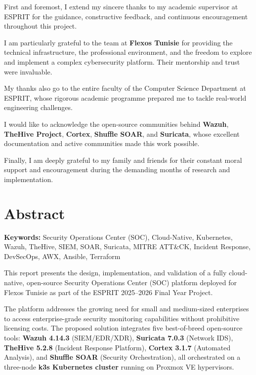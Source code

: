 \documentclass[12pt,a4paper]{report}
\begin{document}
First and foremost, I extend my sincere thanks to my academic supervisor at ESPRIT for the guidance, constructive feedback, and continuous encouragement throughout this project.

I am particularly grateful to the team at \textbf{Flexos Tunisie} for providing the technical infrastructure, the professional environment, and the freedom to explore and implement a complex cybersecurity platform. Their mentorship and trust were invaluable.

My thanks also go to the entire faculty of the Computer Science Department at ESPRIT, whose rigorous academic programme prepared me to tackle real-world engineering challenges.

I would like to acknowledge the open-source communities behind \textbf{Wazuh}, \textbf{TheHive Project}, \textbf{Cortex}, \textbf{Shuffle SOAR}, and \textbf{Suricata}, whose excellent documentation and active communities made this work possible.

Finally, I am deeply grateful to my family and friends for their constant moral support and encouragement during the demanding months of research and implementation.

\newpage
\chapter*{Abstract}

\textbf{Keywords:} Security Operations Center (SOC), Cloud-Native, Kubernetes, Wazuh, TheHive, SIEM, SOAR, Suricata, MITRE ATT\&CK, Incident Response, DevSecOps, AWX, Ansible, Terraform

\vspace{0.5cm}

This report presents the design, implementation, and validation of a fully cloud-native, open-source Security Operations Center (SOC) platform deployed for Flexos Tunisie as part of the ESPRIT 2025--2026 Final Year Project.

The platform addresses the growing need for small and medium-sized enterprises to access enterprise-grade security monitoring capabilities without prohibitive licensing costs. The proposed solution integrates five best-of-breed open-source tools: \textbf{Wazuh 4.14.3} (SIEM/EDR/XDR), \textbf{Suricata 7.0.3} (Network IDS), \textbf{TheHive 5.2.8} (Incident Response Platform), \textbf{Cortex 3.1.7} (Automated Analysis), and \textbf{Shuffle SOAR} (Security Orchestration), all orchestrated on a three-node \textbf{k3s Kubernetes cluster} running on Proxmox VE hypervisors.
\end{document}
